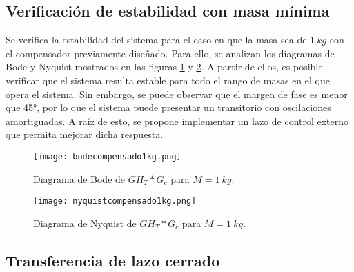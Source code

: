\subsection{Verificación de estabilidad con masa mínima}


\noindent Se verifica la estabilidad del sistema  para el caso en que la masa sea de $1\:kg$ con el compensador previamente diseñado. Para ello, se analizan los diagramas de Bode y Nyquist mostrados en las figuras \ref{fig:bode-analog-para-M-1Kg} y \ref{fig:nyquist-analog-para-M-1Kg}. A partir de ellos, es posible verificar que el sistema resulta estable para todo el rango de masas en el que opera el sistema. Sin embargo, se puede observar que el margen de fase es menor que 45°, por lo que el sistema puede presentar un transitorio con oscilaciones amortiguadas. A raíz de esto, se propone implementar un lazo de control externo que permita mejorar dicha respuesta.

\begin{figure}[H]
	\centering
	\texttt{[image: bodecompensado1kg.png]}
	\caption{Diagrama de Bode de $GH_T*G_c$ para $M=1\:kg$.}
	\label{fig:bode-analog-para-M-1Kg}
\end{figure}


\begin{figure}[H]
	\centering
	\texttt{[image: nyquistcompensado1kg.png]}
	\caption{Diagrama de Nyquist de $GH_T*G_c$ para $M=1\:kg$.}
	\label{fig:nyquist-analog-para-M-1Kg}
\end{figure}


\subsection{Transferencia de lazo cerrado}


